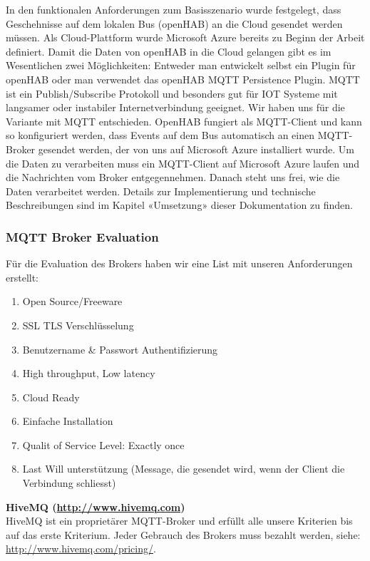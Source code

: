 In den funktionalen Anforderungen zum Basisszenario wurde festgelegt, dass Geschehnisse auf dem lokalen Bus (openHAB) an die Cloud gesendet werden müssen. Als Cloud-Plattform wurde Microsoft Azure bereits zu Beginn der Arbeit definiert. Damit die Daten von openHAB in die Cloud gelangen gibt es im Wesentlichen zwei Möglichkeiten: Entweder man entwickelt selbst ein Plugin für openHAB oder man verwendet das openHAB MQTT Persistence Plugin. MQTT ist ein Publish/Subscribe Protokoll und besonders gut für IOT Systeme mit langsamer oder instabiler Internetverbindung geeignet. Wir haben uns für die Variante mit MQTT entschieden. OpenHAB fungiert als MQTT-Client und kann so konfiguriert werden, dass Events auf dem Bus automatisch an einen MQTT-Broker gesendet werden, der von uns auf Microsoft Azure installiert wurde. Um die Daten zu verarbeiten muss ein MQTT-Client auf Microsoft Azure laufen und die Nachrichten vom Broker entgegennehmen. Danach steht uns frei, wie die Daten verarbeitet werden. Details zur Implementierung und technische Beschreibungen sind im Kapitel «Umsetzung» dieser Dokumentation zu finden. 

\subsubsection{MQTT Broker Evaluation}
Für die Evaluation des Brokers haben wir eine List mit unseren Anforderungen erstellt: 

\begin{enumerate}
	\item Open Source/Freeware
	\item SSL TLS Verschlüsselung
	\item Benutzername \& Passwort Authentifizierung
	\item High throughput, Low latency
	\item Cloud Ready
	\item Einfache Installation
	\item Qualit of Service Level: Exactly once
	\item Last Will unterstützung (Message, die gesendet wird, wenn der Client die Verbindung schliesst)
\end{enumerate}

\textbf{HiveMQ (\url{http://www.hivemq.com})} \\
HiveMQ ist ein proprietärer MQTT-Broker und erfüllt alle unsere Kriterien bis auf das erste Kriterium. Jeder Gebrauch des Brokers muss bezahlt werden, siehe: \url{http://www.hivemq.com/pricing/}.

